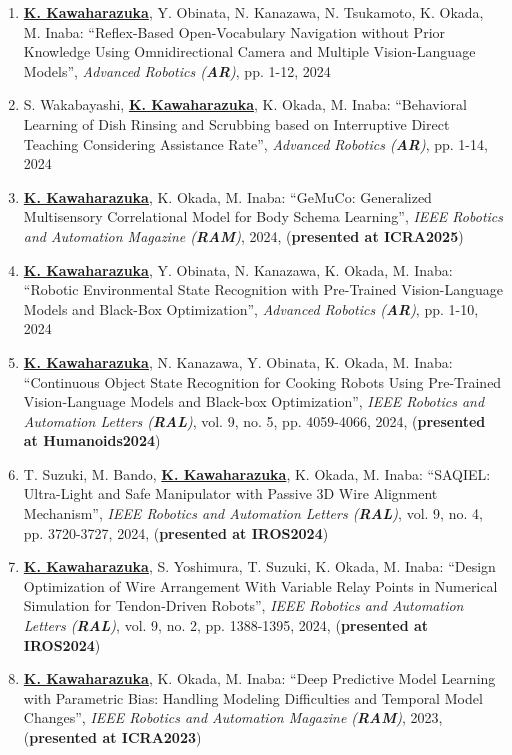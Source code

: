 \documentclass[letterpaper]{article}
\begin{document}
\begin{enumerate}
\item \underline{\textbf{K. Kawaharazuka}}, Y. Obinata, N. Kanazawa, N. Tsukamoto, K. Okada, M. Inaba: ``Reflex-Based Open-Vocabulary Navigation without Prior Knowledge Using Omnidirectional Camera and Multiple Vision-Language Models'', \textit{Advanced Robotics (\textit{\textbf{AR}})}, pp. 1-12, 2024
\item S. Wakabayashi, \underline{\textbf{K. Kawaharazuka}}, K. Okada, M. Inaba: ``Behavioral Learning of Dish Rinsing and Scrubbing based on Interruptive Direct Teaching Considering Assistance Rate'', \textit{Advanced Robotics (\textit{\textbf{AR}})}, pp. 1-14, 2024
\item \underline{\textbf{K. Kawaharazuka}}, K. Okada, M. Inaba: ``GeMuCo: Generalized Multisensory Correlational Model for Body Schema Learning'', \textit{IEEE Robotics and Automation Magazine (\textit{\textbf{RAM}})}, 2024, (\textbf{presented at ICRA2025})
\item \underline{\textbf{K. Kawaharazuka}}, Y. Obinata, N. Kanazawa, K. Okada, M. Inaba: ``Robotic Environmental State Recognition with Pre-Trained Vision-Language Models and Black-Box Optimization'', \textit{Advanced Robotics (\textit{\textbf{AR}})}, pp. 1-10, 2024
\item \underline{\textbf{K. Kawaharazuka}}, N. Kanazawa, Y. Obinata, K. Okada, M. Inaba: ``Continuous Object State Recognition for Cooking Robots Using Pre-Trained Vision-Language Models and Black-box Optimization'', \textit{IEEE Robotics and Automation Letters (\textit{\textbf{RAL}})}, vol. 9, no. 5, pp. 4059-4066, 2024, (\textbf{presented at Humanoids2024})
\item T. Suzuki, M. Bando, \underline{\textbf{K. Kawaharazuka}}, K. Okada, M. Inaba: ``SAQIEL: Ultra-Light and Safe Manipulator with Passive 3D Wire Alignment Mechanism'', \textit{IEEE Robotics and Automation Letters (\textit{\textbf{RAL}})}, vol. 9, no. 4, pp. 3720-3727, 2024, (\textbf{presented at IROS2024})
\item \underline{\textbf{K. Kawaharazuka}}, S. Yoshimura, T. Suzuki, K. Okada, M. Inaba: ``Design Optimization of Wire Arrangement With Variable Relay Points in Numerical Simulation for Tendon-Driven Robots'', \textit{IEEE Robotics and Automation Letters (\textit{\textbf{RAL}})}, vol. 9, no. 2, pp. 1388-1395, 2024, (\textbf{presented at IROS2024})
\item \underline{\textbf{K. Kawaharazuka}}, K. Okada, M. Inaba: ``Deep Predictive Model Learning with Parametric Bias: Handling Modeling Difficulties and Temporal Model Changes'', \textit{IEEE Robotics and Automation Magazine (\textit{\textbf{RAM}})}, 2023, (\textbf{presented at ICRA2023})

\end{enumerate}
\end{document}
